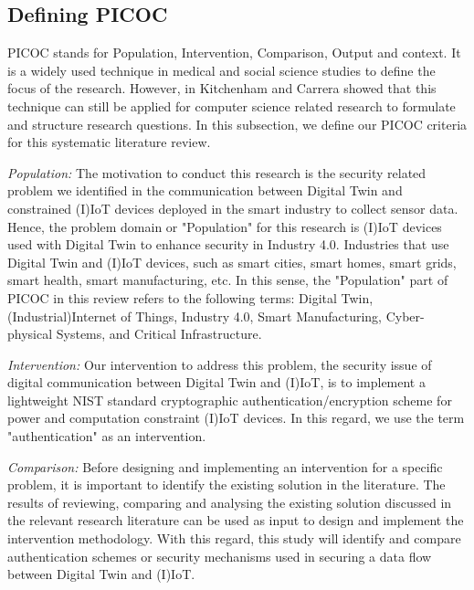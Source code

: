 
\subsection{Defining PICOC}
PICOC stands for Population, Intervention, Comparison, Output and context. It is a widely used technique in medical and social science studies to define the focus of the research\cite{carrera-rivera_how-conduct_2022}. However, in\cite{carrera-rivera_how-conduct_2022, kitchenham_guidelines_2007} Kitchenham and Carrera showed that this technique can still be applied for computer science related research to formulate and structure research questions. In this subsection, we define our PICOC criteria for this systematic literature review.

\textit{Population:} The motivation to conduct this research is the security related problem we identified in the communication between Digital Twin and constrained  (I)IoT devices deployed in the smart industry to collect sensor data. Hence, the problem domain or "Population" for this research is (I)IoT devices used with Digital Twin to enhance security in Industry 4.0. Industries that use Digital Twin and (I)IoT devices, such as smart cities, smart homes, smart grids, smart health, smart manufacturing, etc. In this sense, the "Population" part of PICOC in this review refers to the following terms: Digital Twin, (Industrial)Internet of Things, Industry 4.0, Smart Manufacturing, Cyber-physical Systems, and Critical Infrastructure. 

\textit{Intervention:} Our intervention to address this problem, the security issue of digital communication between Digital Twin and (I)IoT, is to implement a lightweight NIST standard cryptographic authentication/encryption scheme for power and computation constraint (I)IoT devices. In this regard, we use the term "authentication" as an intervention.

\textit{Comparison:} Before designing and implementing an intervention for a specific problem, it is important to identify the existing solution in the literature. The results of reviewing, comparing and analysing the existing solution discussed in the relevant research literature can be used as input to design and implement the intervention methodology. With this regard, this study will identify and compare authentication schemes or security mechanisms used in securing a data flow between Digital Twin and (I)IoT. 


